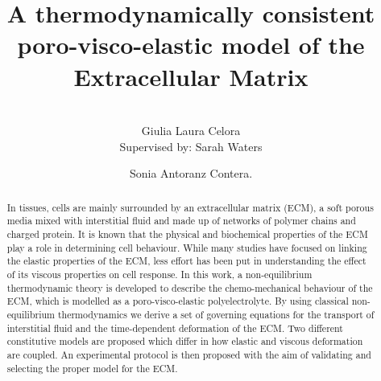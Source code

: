 \documentclass[runningheads]{llncs}
\begin{document}
%
\title{A thermodynamically consistent poro-visco-elastic model of the Extracellular Matrix}
%
%
\author{\\[0.2cm] Giulia Laura Celora \\[0.5cm]{\normalfont Supervised by:} Sarah Waters  \and Sonia Antoranz Contera. }
%
%
\maketitle              %
%
\begin{abstract}
In tissues, cells are mainly surrounded by an extracellular matrix (ECM), a soft porous media mixed with interstitial fluid and made up of networks of polymer chains and charged protein. It is known that the physical and biochemical properties of the ECM play a role in determining cell behaviour. While many studies have focused on linking the elastic properties of the ECM, less effort has been put in understanding the effect of its viscous properties on cell response. In this work, a non-equilibrium thermodynamic theory is developed to describe the chemo-mechanical behaviour of the ECM, which is modelled as a poro-visco-elastic polyelectrolyte. By using classical non-equilibrium thermodynamics we derive a set of governing equations for the transport of interstitial fluid and the time-dependent deformation of the ECM. Two different constitutive models are proposed which differ in how elastic and viscous deformation are coupled. An experimental protocol is then proposed with the aim of validating and selecting the proper model for the ECM.
\end{abstract}
%
%
%

\end{document}
